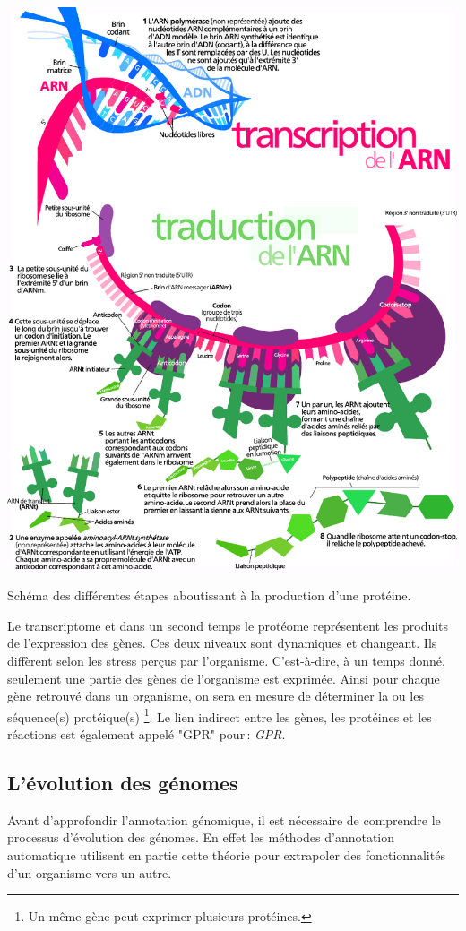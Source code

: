 \begin{refsegment}
    \begin{shadedfigure}[H]
        \centering
        \includegraphics[width=\textwidth]{img/production_proteine2.pdf}
        \caption{Schéma des différentes étapes aboutissant à la production d’une protéine.}
        \label{fig:production_proteine}
    \end{shadedfigure}
    
    Le transcriptome et dans un second temps le protéome représentent les produits de l'expression des gènes. Ces deux niveaux sont dynamiques et changeant. Ils diffèrent selon les stress perçus par l'organisme. C'est-à-dire, à un temps donné, seulement une partie des gènes de l'organisme est exprimée. Ainsi pour chaque gène retrouvé dans un organisme, on sera en mesure de déterminer la ou les séquence(s) protéique(s) \footnote{Un même gène peut exprimer plusieurs protéines.}. Le lien indirect entre les gènes, les protéines et les réactions est également appelé "\acrshort{GPR}" pour : \textit{\acrfull{GPR}}.
    
    \subsection{L’évolution des génomes}
    Avant d'approfondir l’annotation génomique, il est nécessaire de comprendre le processus d’évolution des génomes. En effet les méthodes d’annotation automatique utilisent en partie cette théorie pour extrapoler des fonctionnalités d’un organisme vers un autre.
    

\end{refsegment}
